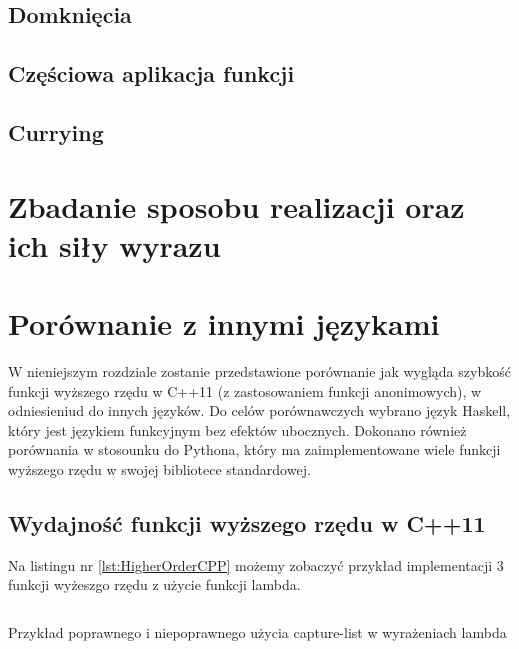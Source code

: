 \documentclass{pracamgr}
\begin{document}
\section{Domknięcia}
\section{Częściowa aplikacja funkcji}
\section{Currying}



\chapter{Zbadanie sposobu realizacji oraz ich siły wyrazu}\label{r:SposobRealizacji}
 








\chapter{Porównanie z innymi językami}\label{r:Porownanie}

W nieniejszym rozdziale zostanie przedstawione porównanie jak wygląda szybkość funkcji 
wyższego rzędu w C++11 (z zastosowaniem funkcji anonimowych), w odniesieniud do innych języków.
Do celów porównawczych wybrano język Haskell, który jest językiem funkcyjnym bez efektów ubocznych.
Dokonano również porównania w stosounku do Pythona, który ma zaimplementowane wiele 
funkcji wyższego rzędu w swojej bibliotece standardowej.

\section{Wydajność funkcji wyższego rzędu w C++11}


Na listingu nr \ref{lst:HigherOrderCPP} możemy zobaczyć przykład implementacji 3 funkcji wyżeszgo rzędu 
z użycie funkcji lambda. 

\begin{listing}[H]
\inputminted[mathescape, linenos, numbersep=5pt, bgcolor=bg, rulecolor=\color{darkgray}, frame=lines, framesep=2mm]{cpp}{../SEM1/fun.cpp}
\caption{Przykład poprawnego i niepoprawnego użycia capture-list w wyrażeniach lambda}
\label{lst:HigherOrderCPP}
\end{listing}
\end{document}
